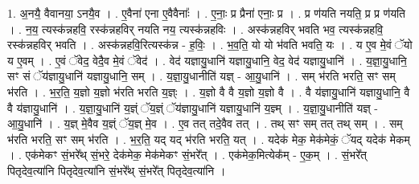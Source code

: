 \documentclass[17pt]{extarticle}
\begin{document}
1. अ॒नयै॒ वैवानया॒ ऽनयै॒व । . ए॒वैना॑ एना ए॒वैवैनाः᳚ । . ए॒नाः॒ प्र प्रैना॑ एनाः॒ प्र । . प्र ण॑यति नयति॒ प्र प्र ण॑यति । . न॒य॒ त्यस्क॑न्नहवि॒ रस्क॑न्नहविर् नयति नय॒ त्यस्क॑न्नहविः । . अस्क॑न्नहविर् भवति भव॒ त्यस्क॑न्नहवि॒ रस्क॑न्नहविर् भवति । . अस्क॑न्नहवि॒रित्यस्क॑न्न - ह॒विः॒ । . भ॒व॒ति॒ यो यो भ॑वति भवति॒ यः । . य ए॒व मे॒वं ॅयो य ए॒वम् । . ए॒वं ॅवेद॒ वेदै॒व मे॒वं ॅवेद॑ । . वेद॑ यज्ञायु॒धानि॑ यज्ञायु॒धानि॒ वेद॒ वेद॑ यज्ञायु॒धानि॑ । . य॒ज्ञा॒यु॒धानि॒ सꣳ सं ॅय॑ज्ञायु॒धानि॑ यज्ञायु॒धानि॒ सम् । . य॒ज्ञा॒यु॒धानीति॑ यज्ञ् - आ॒यु॒धानि॑ । . सम् भ॑रति भरति॒ सꣳ सम् भ॑रति । . भ॒र॒ति॒ य॒ज्ञो य॒ज्ञो भ॑रति भरति य॒ज्ञ्ः । . य॒ज्ञो वै वै य॒ज्ञो य॒ज्ञो वै । . वै य॑ज्ञायु॒धानि॑ यज्ञायु॒धानि॒ वै वै य॑ज्ञायु॒धानि॑ । . य॒ज्ञा॒यु॒धानि॑ य॒ज्ञ्ं ॅय॒ज्ञ्ं ॅय॑ज्ञायु॒धानि॑ यज्ञायु॒धानि॑ य॒ज्ञ्म् । . य॒ज्ञा॒यु॒धानीति॑ यज्ञ् - आ॒यु॒धानि॑ । . य॒ज्ञ् मे॒वैव य॒ज्ञ्ं ॅय॒ज्ञ् मे॒व । . ए॒व तत् तदे॒वैव तत् । . तथ् सꣳ सम् तत् तथ् सम् । . सम् भ॑रति भरति॒ सꣳ सम् भ॑रति । . भ॒र॒ति॒ यद् यद् भ॑रति भरति॒ यत् । . यदेक॑ मेक॒ मेक॑मेकं॒ ॅयद् यदेक॑ मेकम् । . एक॑मेकꣳ सं॒भरे᳚थ् सं॒भरे॒ देक॑मेक॒ मेक॑मेकꣳ सं॒भरे᳚त् । . एक॑मेक॒मित्येक᳚म् - ए॒क॒म् । . सं॒भरे᳚त् पितृदेव॒त्या॑नि पितृदेव॒त्या॑नि सं॒भरे᳚थ् सं॒भरे᳚त् पितृदेव॒त्या॑नि । \newline
\end{document}
